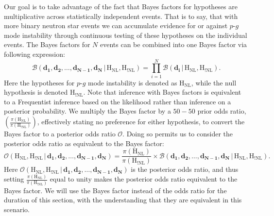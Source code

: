 Our goal is to take advantage of the fact that Bayes factors for hypotheses are multiplicative across statistically independent events. That is to say, that with more binary neutron star events we can accumulate evidence for or against $p$-$g$ mode instability through continuous testing of these hypotheses on the individual events. The Bayes factors for $N$ events can be combined into one Bayes factor via following expression:
\begin{equation}\label{eqn:cumulative_bayes_factor}
    \mathcal{B}(\mathbf{d_1}, \mathbf{d_2}, \ldots,  \mathbf{d_{N-1}}, \mathbf{d_{N}} \, | \, \mathrm{H}_{\mathrm{NL}}, \mathrm{H}_{\mathrm{!NL}}) = \prod_{i=1}^N \mathcal{B}(\mathbf{d_i} \, | \, \mathrm{H}_{\mathrm{NL}}, \mathrm{H}_{\mathrm{!NL}}).
\end{equation}
Here the hypotheses for $p$-$g$ mode instability is denoted as $\mathrm{H}_{\mathrm{NL}}$, while the null hypothesis is denoted $\mathrm{H}_{\mathrm{!NL}}$. Note that inference with Bayes factors is equivalent to a Frequentist inference based on the likelihood rather than inference on a posterior probability. We multiply the Bayes factor by a $50 - 50$ prior odds ratio, $\left(\frac{\pi(\mathrm{H}_{\mathrm{NL}})}{\pi(\mathrm{H}_{\mathrm{!NL}})}\right)$, effectively stating no preference for either hypothesis, to convert the Bayes factor to a posterior odds ratio $\mathcal{O}$. Doing so permits us to consider the posterior odds ratio as equivalent to the Bayes factor:
\begin{equation}\label{eqn:posterior_odds_ratio}
    \mathcal{O}(\mathrm{H}_{\mathrm{NL}}, \mathrm{H}_{\mathrm{!NL}} \, | \, \mathbf{d_1}, \mathbf{d_2}, \ldots,  \mathbf{d_{N-1}}, \mathbf{d_{N}}) = \frac{\pi(\mathrm{H}_{\mathrm{NL}})}{\pi(\mathrm{H}_{\mathrm{!NL}})} \times \mathcal{B}(\mathbf{d_1}, \mathbf{d_2}, \ldots,  \mathbf{d_{N-1}}, \mathbf{d_{N}}\, | \, \mathrm{H}_{\mathrm{NL}}, \mathrm{H}_{\mathrm{!NL}}).
\end{equation}
Here $\mathcal{O}(\mathrm{H}_{\mathrm{NL}}, \mathrm{H}_{\mathrm{!NL}} \, | \, \mathbf{d_1}, \mathbf{d_2}, \ldots,  \mathbf{d_{N-1}}, \mathbf{d_{N}})$ is the posterior odds ratio, and thus setting  $\frac{\pi(\mathrm{H}_{\mathrm{NL}})}{\pi(\mathrm{H}_{\mathrm{!NL}})}$ equal to unity makes the posterior odds ratio equivalent to the Bayes factor. We will use the Bayes factor instead of the odds ratio for the duration of this section, with the understanding that they are equivalent in this scenario.

